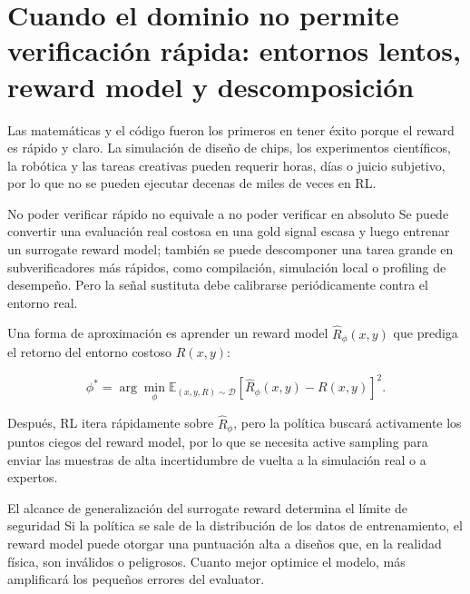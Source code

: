 \section{Cuando el dominio no permite verificación rápida: entornos lentos, reward model y descomposición}


Las matemáticas y el código fueron los primeros en tener éxito porque el reward es rápido y claro. La simulación de diseño de chips, los experimentos científicos, la robótica y las tareas creativas pueden requerir horas, días o juicio subjetivo, por lo que no se pueden ejecutar decenas de miles de veces en RL.

\begin{importantbox}{No poder verificar rápido no equivale a no poder verificar en absoluto}
Se puede convertir una evaluación real costosa en una gold signal escasa y luego entrenar un surrogate reward model; también se puede descomponer una tarea grande en subverificadores más rápidos, como compilación, simulación local o profiling de desempeño. Pero la señal sustituta debe calibrarse periódicamente contra el entorno real.
\end{importantbox}

Una forma de aproximación es aprender un reward model $\hat R_\phi(x,y)$ que prediga el retorno del entorno costoso $R(x,y)$:

$$
\phi^*=\arg\min_\phi
\mathbb E_{(x,y,R)\sim \mathcal D}
\left[\hat R_\phi(x,y)-R(x,y)\right]^2.
$$

Después, RL itera rápidamente sobre $\hat R_\phi$, pero la política buscará activamente los puntos ciegos del reward model, por lo que se necesita active sampling para enviar las muestras de alta incertidumbre de vuelta a la simulación real o a expertos.

\begin{warningbox}{El alcance de generalización del surrogate reward determina el límite de seguridad}
Si la política se sale de la distribución de los datos de entrenamiento, el reward model puede otorgar una puntuación alta a diseños que, en la realidad física, son inválidos o peligrosos. Cuanto mejor optimice el modelo, más amplificará los pequeños errores del evaluator.
\end{warningbox}

